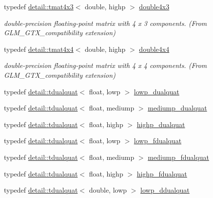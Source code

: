 \begin{DoxyCompactItemize}
typedef \hyperlink{structglm_1_1detail_1_1tmat4x3}{detail\+::tmat4x3}$<$ double, highp $>$ \hyperlink{group__gtx__compatibility_ga1199ee41226db53d5f190d0628041845}{double4x3}
\begin{DoxyCompactList}\small\item\em double-\/precision floating-\/point matrix with 4 x 3 components. (From G\+L\+M\+\_\+\+G\+T\+X\+\_\+compatibility extension) \end{DoxyCompactList}\item 
typedef \hyperlink{structglm_1_1detail_1_1tmat4x4}{detail\+::tmat4x4}$<$ double, highp $>$ \hyperlink{group__gtx__compatibility_ga95e88bfe8dea34a6d4b30b1029c3e2da}{double4x4}
\begin{DoxyCompactList}\small\item\em double-\/precision floating-\/point matrix with 4 x 4 components. (From G\+L\+M\+\_\+\+G\+T\+X\+\_\+compatibility extension) \end{DoxyCompactList}\item 
typedef \hyperlink{structglm_1_1detail_1_1tdualquat}{detail\+::tdualquat}$<$ float, lowp $>$ \hyperlink{group__gtc__dual__quaternion_gae1772179edc60f4e8b46c8772eeeccee}{lowp\+\_\+dualquat}
\item 
typedef \hyperlink{structglm_1_1detail_1_1tdualquat}{detail\+::tdualquat}$<$ float, mediump $>$ \hyperlink{group__gtc__dual__quaternion_ga71fc1c10a382330c1fee55ce29703405}{mediump\+\_\+dualquat}
\item 
typedef \hyperlink{structglm_1_1detail_1_1tdualquat}{detail\+::tdualquat}$<$ float, highp $>$ \hyperlink{group__gtc__dual__quaternion_gaf3a01deb502f53ca555ee1d45e6d6776}{highp\+\_\+dualquat}
\item 
typedef \hyperlink{structglm_1_1detail_1_1tdualquat}{detail\+::tdualquat}$<$ float, lowp $>$ \hyperlink{group__gtc__dual__quaternion_gae62c636c63c9eb3c1ea6d10f4b7d7c81}{lowp\+\_\+fdualquat}
\item 
typedef \hyperlink{structglm_1_1detail_1_1tdualquat}{detail\+::tdualquat}$<$ float, mediump $>$ \hyperlink{group__gtc__dual__quaternion_gab211d24786158490e57dfa57d7744f71}{mediump\+\_\+fdualquat}
\item 
typedef \hyperlink{structglm_1_1detail_1_1tdualquat}{detail\+::tdualquat}$<$ float, highp $>$ \hyperlink{group__gtc__dual__quaternion_ga2ed3283c09d3ffaf52a0e0a4b248eab6}{highp\+\_\+fdualquat}
\item 
typedef \hyperlink{structglm_1_1detail_1_1tdualquat}{detail\+::tdualquat}$<$ double, lowp $>$ \hyperlink{group__gtc__dual__quaternion_ga29461fddd543ffdf65a199fc28c42458}{lowp\+\_\+ddualquat}

\end{DoxyCompactItemize}
